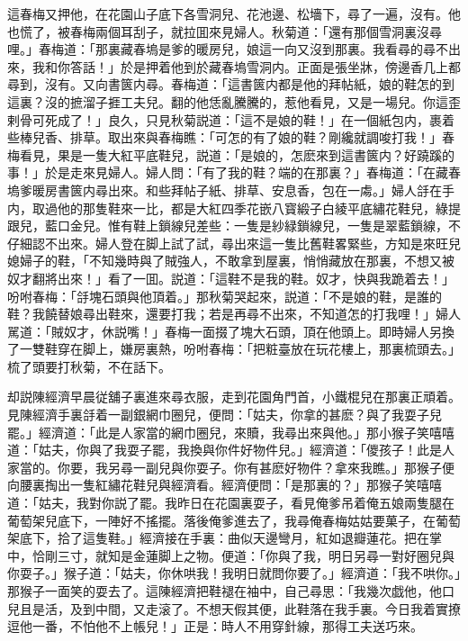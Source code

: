 這春梅又押他，在花園山子底下各雪洞兒、花池邊、松墻下，尋了一遍，沒有。他也慌了，被春梅兩個耳刮子，就拉囬來見婦人。秋菊道：「還有那個雪洞裏沒尋哩。」春梅道：「那裏藏春塢是爹的暖房兒，娘這一向又沒到那裏。我看尋的尋不出來，我和你答話！」於是押着他到於藏春塢雪洞内。正面是張坐牀，傍邊香几上都尋到，沒有。又向書篋内尋。春梅道：「這書篋内都是他的拜帖紙，娘的鞋怎的到這裏？沒的摭溜子捱工夫兒。翻的他恁亂騰騰的，惹他看見，又是一場兒。你這歪剌骨可死成了！」良久，只見秋菊説道：「這不是娘的鞋！」在一個紙包内，裹着些棒兒香、排草。取出來與春梅瞧：「可怎的有了娘的鞋？剛纔就調唆打我！」春梅看見，果是一隻大紅平底鞋兒，説道：「是娘的，怎麽來到這書篋内？好蹺蹊的事！」於是走來見婦人。婦人問：「有了我的鞋？端的在那裏？」春梅道：「在藏春塢爹暖房書篋内尋出來。和些拜帖子紙、排草、安息香，包在一䖏。」婦人㧱在手内，取過他的那隻鞋來一比，都是大紅四季花嵌八寳緞子白綾平底繡花鞋兒，綠提跟兒，藍口金兒。惟有鞋上鎖線兒差些：一隻是紗緑鎖線兒，一隻是翠藍鎖線，不仔細認不出來。婦人登在脚上試了試，尋出來這一隻比舊鞋畧緊些，方知是來旺兒媳婦子的鞋，「不知幾時與了賊強人，不敢拿到屋裏，悄悄藏放在那裏，不想又被奴才翻將出來！」看了一囬。説道：「這鞋不是我的鞋。奴才，快與我跪着去！」吩咐春梅：「㧱塊石頭與他頂着。」那秋菊哭起來，説道：「不是娘的鞋，是誰的鞋？我饒替娘尋出鞋來，還要打我；若是再尋不出來，不知道怎的打我哩！」婦人駡道：「賊奴才，休説嘴！」春梅一面掇了塊大石頭，頂在他頭上。即時婦人另換了一雙鞋穿在脚上，嫌房裏熱，吩咐春梅：「把粧臺放在玩花樓上，那裏梳頭去。」梳了頭要打秋菊，不在話下。

却説陳經濟早晨従舖子裏進來尋衣服，走到花園角門首，小鐵棍兒在那裏正頑着。見陳經濟手裏㧱着一副銀網巾圈兒，便問：「姑夫，你拿的甚麽？與了我耍子兒罷。」經濟道：「此是人家當的網巾圈兒，來贖，我尋出來與他。」那小猴子笑嘻嘻道：「姑夫，你與了我耍子罷，我換與你件好物件兒。」經濟道：「儍孩子！此是人家當的。你要，我另尋一副兒與你耍子。你有甚麽好物件？拿來我瞧。」那猴子便向腰裏掏出一隻紅繡花鞋兒與經濟看。經濟便問：「是那裏的？」那猴子笑嘻嘻道：「姑夫，我對你説了罷。我昨日在花園裏耍子，看見俺爹吊着俺五娘兩隻腿在葡萄架兒底下，一陣好不搖擺。落後俺爹進去了，我尋俺春梅姑姑要菓子，在葡萄架底下，拾了這隻鞋。」經濟接在手裏：曲似天邊彎月，紅如退瓣蓮花。把在掌中，恰剛三寸，就知是金蓮脚上之物。便道：「你與了我，明日另尋一對好圈兒與你耍子。」猴子道：「姑夫，你休哄我！我明日就問你要了。」經濟道：「我不哄你。」那猴子一面笑的耍去了。這陳經濟把鞋褪在袖中，自己尋思：「我幾次戯他，他口兒且是活，及到中間，又走滚了。不想天假其便，此鞋落在我手裏。今日我着實撩逗他一番，不怕他不上帳兒！」正是：時人不用穿針線，那得工夫送巧來。

